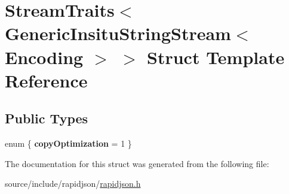 \hypertarget{struct_stream_traits_3_01_generic_insitu_string_stream_3_01_encoding_01_4_01_4}{}\section{Stream\+Traits$<$ Generic\+Insitu\+String\+Stream$<$ Encoding $>$ $>$ Struct Template Reference}
\label{struct_stream_traits_3_01_generic_insitu_string_stream_3_01_encoding_01_4_01_4}
\subsection*{Public Types}
\begin{DoxyCompactItemize}
\item 
\hypertarget{struct_stream_traits_3_01_generic_insitu_string_stream_3_01_encoding_01_4_01_4_a67a610522828f475093e1e3c3b51a793}{}enum \{ {\bfseries copy\+Optimization} = 1
 \}\label{struct_stream_traits_3_01_generic_insitu_string_stream_3_01_encoding_01_4_01_4_a67a610522828f475093e1e3c3b51a793}

\end{DoxyCompactItemize}


The documentation for this struct was generated from the following file\+:\begin{DoxyCompactItemize}
\item 
source/include/rapidjson/\hyperlink{rapidjson_8h}{rapidjson.\+h}\end{DoxyCompactItemize}

